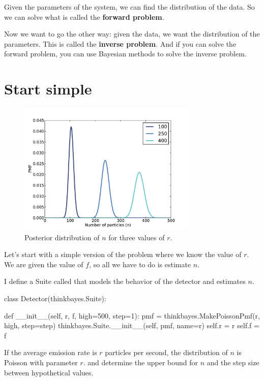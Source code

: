 \documentclass[12pt]{book}
\theoremstyle{exercise}
\begin{document}
Given the parameters of the system, we can find the distribution of
the data.  So we can solve what is called the {\bf forward problem}.

Now we want to go the other way: given the data, we
want the distribution of the parameters.  This is called
the {\bf inverse problem}.  And if you can solve the forward
problem, you can use Bayesian methods to solve the inverse problem.


\section{Start simple}

\begin{figure}
\centerline{\includegraphics[height=2.5in]{figs/jaynes1.pdf}}
\caption{Posterior distribution of $n$ for three values of $r$.}
\label{fig.jaynes1}
\end{figure}

Let's start with a simple version of the problem where we know
the value of $r$.  We are given the value of $f$, so all we
have to do is estimate $n$.

I define a Suite called  that models the behavior
of the detector and estimates $n$.

\begin{code}
class Detector(thinkbayes.Suite):

    def __init__(self, r, f, high=500, step=1):
        pmf = thinkbayes.MakePoissonPmf(r, high, step=step)
        thinkbayes.Suite.__init__(self, pmf, name=r)
        self.r = r
        self.f = f
\end{code}

If the average emission rate is $r$ particles per second, the
distribution of $n$ is Poisson with parameter $r$.
 and  determine the upper bound for $n$
and the step size between hypothetical values.
\end{document}
